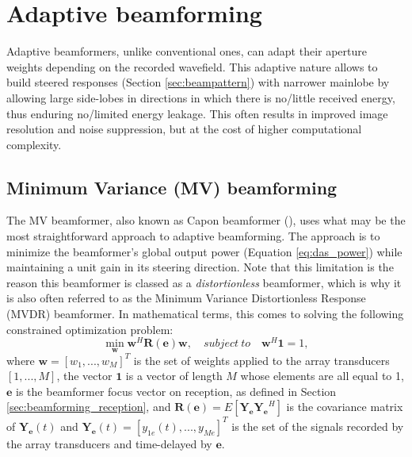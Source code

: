 
\section{Adaptive beamforming}
\label{sec:adaptive_beamforming}
Adaptive beamformers, unlike conventional ones, can adapt their aperture weights depending on the recorded wavefield. This adaptive nature allows to build steered responses (Section \ref{sec:beampattern}) with narrower mainlobe by allowing large side-lobes in directions in which there is no/little received energy, thus enduring no/limited energy leakage. This often results in improved image resolution and noise suppression, but at the cost of higher computational complexity.

\subsection{Minimum Variance (MV) beamforming}
\label{sec:MV}
The MV beamformer, also known as Capon beamformer (\cite{Capon}), uses what may be the most straightforward approach to adaptive beamforming. The approach is to minimize the beamformer's global output power (Equation \ref{eq:das_power}) while maintaining a unit gain in its steering direction. Note that this limitation is the reason this beamformer is classed as a \textit{distortionless} beamformer, which is why it is also often referred to as the Minimum Variance Distortionless Response (MVDR) beamformer. In mathematical terms, this comes to solving the following constrained optimization problem:
\begin{equation}
    \min_{\boldsymbol{w}} \boldsymbol{w}^H \boldsymbol{R(e)} \boldsymbol{w}, \quad subject ~ to \quad \boldsymbol{w}^H \boldsymbol{1} = 1,
\label{eq:mv_problem}
\end{equation}
\noindent
where $\boldsymbol{w} = [w_1, ..., w_M]^T$ is the set of weights applied to the array transducers $[1,...,M]$, the vector $\boldsymbol{1}$ is a vector of length $M$ whose elements are all equal to 1, $\boldsymbol{e}$ is the beamformer focus vector on reception, as defined in Section \ref{sec:beamforming_reception}, and $\boldsymbol{R(e)} = E[\boldsymbol{Y_e} \boldsymbol{Y_e}^H]$ is the covariance matrix of $\boldsymbol{Y_e}(t)$ and $\boldsymbol{Y_e}(t) = [y_{1e}(t), ..., y_{Me}]^T$ is the set of the signals recorded by the array transducers and time-delayed by $\boldsymbol{e}$.

